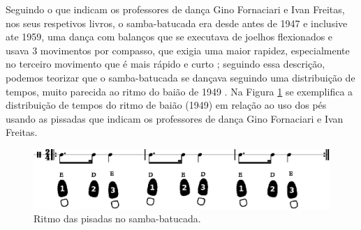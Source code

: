 \begin{itemize}
Seguindo o que indicam  os professores de dança Gino Fornaciari e Ivan Freitas,
nos seus respetivos livros, o samba-batucada era desde antes de 1947 e inclusive ate 1959, 
uma dança com balanços que se executava de joelhos flexionados  
e usava 3 movimentos por compasso, que exigia uma maior rapidez, 
especialmente no terceiro movimento que é mais rápido e curto 
\cite[pp. 61]{fornaciari1947aprender} \cite[pp. 58,66]{freitas1959danca};
seguindo essa descrição, 
podemos teorizar que o samba-batucada se dançava seguindo uma distribuição de tempos,
muito parecida ao ritmo do baião de 1949 \cite{CORTES2014}.
Na Figura \ref{time:sambabatucada} se exemplifica a distribuição de tempos do ritmo de baião (1949) em relação ao uso dos pés usando as pissadas que indicam os professores de dança Gino Fornaciari e Ivan Freitas.
\begin{figure}[H]
\centering
\includegraphics[width=\textwidth]{chapters/cap-historia-sambagafieira/sambabatucada.eps}
\caption{Ritmo das pisadas no samba-batucada.}
\label{time:sambabatucada}
\end{figure}


\end{itemize}
